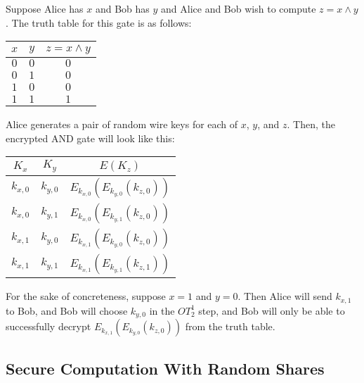 Suppose Alice has $x$ and Bob has $y$ and Alice and Bob wish to
compute $z=x\wedge y$. The truth table for this gate is as follows:

\begin{tabular}{|c|c|c|}
\hline 
$x$ & $y$ & $z=x\wedge y$\tabularnewline
\hline
\hline 
$0$ & $0$ & $0$\tabularnewline
\hline 
$0$ & $1$ & $0$\tabularnewline
\hline 
$1$ & $0$ & $0$\tabularnewline
\hline 
$1$ & $1$ & $1$\tabularnewline
\hline
\end{tabular}

Alice generates a pair of random wire keys for each of $x$, $y$,
and $z$. Then, the encrypted AND gate will look like this:

\begin{tabular}{|c|c|c|}
\hline 
$K_{x}$ & $K_{y}$ & $E\left(K_{z}\right)$\tabularnewline
\hline
\hline 
$k_{x,0}$ & $k_{y,0}$ & $E_{k_{x,0}}\left(E_{k_{y,0}}\left(k_{z,0}\right)\right)$\tabularnewline
\hline 
$k_{x,0}$ & $k_{y,1}$ & $E_{k_{x,0}}\left(E_{k_{y,1}}\left(k_{z,0}\right)\right)$\tabularnewline
\hline 
$k_{x,1}$ & $k_{y,0}$ & $E_{k_{x,1}}\left(E_{k_{y,0}}\left(k_{z,0}\right)\right)$\tabularnewline
\hline 
$k_{x,1}$ & $k_{y,1}$ & $E_{k_{x,1}}\left(E_{k_{y,1}}\left(k_{z,1}\right)\right)$\tabularnewline
\hline
\end{tabular}

For the sake of concreteness, suppose $x=1$ and $y=0$. Then Alice
will send $k_{x,1}$to Bob, and Bob will choose $k_{y,0}$ in the
$OT_{2}^{1}$ step, and Bob will only be able to successfully decrypt
$E_{k_{x,1}}\left(E_{k_{y,0}}\left(k_{z,0}\right)\right)$ from the
truth table.


\subsection{Secure Computation With Random Shares}

